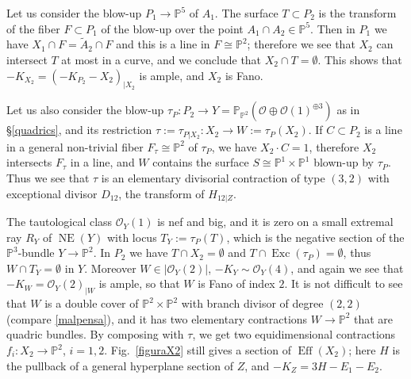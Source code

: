 \documentclass[a4paper,12pt]{amsart}
\theoremstyle{definition}
\numberwithin{figure}{section}
\numberwithin{table}{section}
\newcommand{\w}{\widetilde}
\newcommand{\ol}{\mathcal{O}}
\newcommand{\pr}{\mathbb{P}}
\newcommand{\NE}{\operatorname{NE}}
\newcommand{\Exc}{\operatorname{Exc}}
\newcommand{\Eff}{\operatorname{Eff}}
\begin{document}
Let us consider the  blow-up $P_1\to\pr^5$ of $A_1$. The surface $T\subset P_2$ is the transform of the fiber $F\subset P_1$ of the blow-up over the point $A_1\cap A_2\in\pr^5$. Then in $P_1$ we have $X_1\cap F=\w{A}_2\cap F$ and this is a line in $F\cong\pr^2$; therefore we see that $X_2$ can intersect $T$ at most in a curve, and we conclude that $X_2\cap T=\emptyset$. This shows that $-K_{X_2}=(-K_{P_2}-X_2)_{|X_2}$ is ample, and $X_2$ is Fano.

Let us also consider the blow-up $\tau_P\colon P_2\to Y=\pr_{\pr^2}(\ol\oplus\ol(1)^{\oplus 3})$ as in \S\ref{quadrics}, and its restriction $\tau:=\tau_{P|X_2}\colon X_2\to W:=\tau_P(X_2)$.
If $C\subset P_2$ is a line in a general non-trivial fiber $F_{\tau}\cong\pr^2$ of $\tau_P$, we have
 $X_2\cdot C=1$, therefore $X_2$ intersects $F_{\tau}$ in a line, and $W$ contains the surface $S\cong\pr^1\times\pr^1$ blown-up by $\tau_P$.  Thus we see that $\tau$ is an elementary divisorial contraction of type $(3,2)$ with exceptional divisor $D_{12}$, the transform of $H_{12|Z}$.

The tautological class $\ol_Y(1)$ is nef and big, and it is zero on a small extremal ray $R_Y$ of $\NE(Y)$ with locus $T_Y:=\tau_P(T)$, which is the negative section of the $\pr^3$-bundle $Y\to\pr^2$. In $P_2$ we have $T\cap X_2=\emptyset$ and $T\cap\Exc(\tau_P)=\emptyset$, thus $W\cap T_Y=\emptyset$ in $Y$.
Moreover
$W\in|\ol_Y(2)|$, $-K_Y\sim \ol_Y(4)$, and again we see that $-K_{W}=\ol_Y(2)_{|W}$ is ample, so that $W$ is Fano of index $2$. 
It is not difficult to see that $W$ is a double cover of $\pr^2\times\pr^2$ with branch divisor of degree $(2,2)$ (compare \ref{malpensa}), and it has two elementary contractions $W\to\pr^2$ that are quadric bundles. By composing with $\tau$, we get two equidimensional contractions $f_i\colon X_2\to\pr^2$, $i=1,2$. Fig.~\ref{figuraX2} still gives a section of $\Eff(X_2)$; here $H$ is the pullback of a general hyperplane section of $Z$, and $-K_Z=3H-E_1-E_2$.

\bigskip

\bigskip

\small
\end{document}
